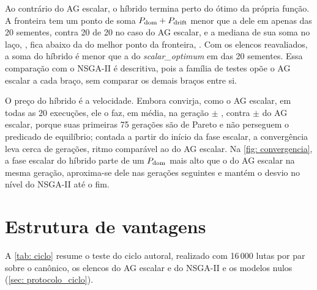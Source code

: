 Ao contrário do AG escalar, o híbrido termina perto do ótimo da própria função. A fronteira tem um ponto de soma $P_{\mathrm{dom}} + P_{\mathrm{drift}}$ menor que a dele em apenas \hibFronteiraMelhor{} das 20 sementes, contra 20 de 20 no caso do AG escalar, e a mediana de sua soma no laço, \somaHib{}, fica abaixo da do melhor ponto da fronteira, \somaFronteira{}. Com os elencos reavaliados, a soma do híbrido é menor que a do \textit{scalar\_optimum} em \somaReavHibMelhorSO{} das 20 sementes. Essa comparação com o NSGA-II é descritiva, pois a família de testes opõe o AG escalar a cada braço, sem comparar os demais braços entre si.

O preço do híbrido é a velocidade. Embora convirja, como o AG escalar, em todas as 20 execuções, ele o faz, em média, na geração \convGerMediaHib{} $\pm$ \convGerDpHib{}, contra \convGerMediaAG{} $\pm$ \convGerDpAG{} do AG escalar, porque suas primeiras 75 gerações são de Pareto e não perseguem o predicado de equilíbrio; contada a partir do início da fase escalar, a convergência leva cerca de \convGerFaseEscalarHib{} gerações, ritmo comparável ao do AG escalar. Na \autoref{fig: convergencia}, a fase escalar do híbrido parte de um $P_{\mathrm{dom}}$ mais alto que o do AG escalar na mesma geração, aproxima-se dele nas gerações seguintes e mantém o desvio no nível do NSGA-II até o fim.

\section{Estrutura de vantagens}
\label{sec: res_ciclo}

A \autoref{tab: ciclo} resume o teste do ciclo autoral, realizado com 16\,000 lutas por par sobre o canônico, os elencos do AG escalar e do NSGA-II e os modelos nulos (\autoref{sec: protocolo_ciclo}).

